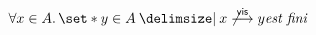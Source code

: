 \begin{equation}
    \forall x \in A \qsep \set*{y \in A \given x \not\vis y} \textit{est fini}
\end{equation}







